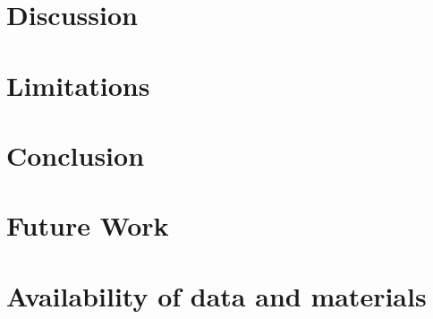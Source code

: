 
\section{Discussion}
\label{sec:denovo-discussion}

\section{Limitations}
\label{sec:denovo-limits}
\section{Conclusion}

\section{Future Work}
\label{sec:denovo-fw}

\section{Availability of data and materials}
